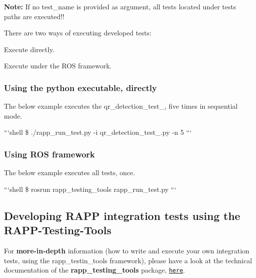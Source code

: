 {\bfseries Note\-:} If no test\-\_\-name is provided as argument, all tests located under tests paths are executed!!

There are two ways of executing developed tests\-:
\begin{DoxyItemize}
\item Execute directly.
\item Execute under the R\-O\-S framework.
\end{DoxyItemize}

\subsubsection*{Using the python executable, directly}

The below example executes the qr\-\_\-detection\-\_\-test\-\_, five times in sequential mode.

```shell \$ ./rapp\-\_\-run\-\_\-test.py -\/i qr\-\_\-detection\-\_\-test\-\_.\-py -\/n 5 ```

\subsubsection*{Using R\-O\-S framework}

The below example executes all tests, once.

```shell \$ rosrun rapp\-\_\-testing\-\_\-tools rapp\-\_\-run\-\_\-test.\-py ```

\subsection*{Developing R\-A\-P\-P integration tests using the R\-A\-P\-P-\/\-Testing-\/\-Tools}

For {\bfseries more-\/in-\/depth} information (how to write and execute your own integration tests, using the rapp\-\_\-testin\-\_\-tools framework), please have a look at the technical documentation of the {\bfseries rapp\-\_\-testing\-\_\-tools} package, \href{https://github.com/rapp-project/rapp-platform/tree/master/rapp_testing_tools}{\tt here}. 